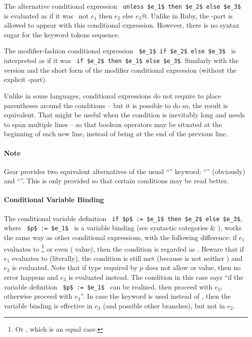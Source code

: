 The alternative conditional expression ~\lstinline!unless $e_1$ then $e_2$ else $e_3$!~ is evaluated as if it was ~\lstinline@if not $e_1$ then $e_2$ else $e_3$@. Unlike in Ruby, the -part is allowed to appear with this conditional expression. However, there is no syntax sugar for the  keyword tokens sequence. 

The modifier-fashion conditional expression ~\lstinline!$e_1$ if $e_2$ else $e_3$!~ is interpreted as if it was ~\lstinline!if $e_2$ then $e_1$ else $e_3$!. Similarly with the  version and the short form of the modifier conditional expression (without the explicit -part). 

Unlike in some languages, conditional expressions do not require to place parentheses around the conditions -- but it is possible to do so, the result is equivalent. That might be useful when the condition is inevitably long and needs to span multiple lines -- so that boolean operators may be situated at the beginning of each new line, instead of being at the end of the previous line. 

\paragraph{Note}
Gear provides two equivalent alternatives of the usual ``'' keyword: ``'' (obviously) and ``''. This is only provided so that certain conditions may be read better.

\paragraph{Conditional Variable Binding}
The conditional variable definition ~\lstinline!if $p$ := $e_1$ then $e_2$ else $e_3$!, where ~\lstinline!$p$ := $e_1$!~ is a variable binding (see syntactic categories  \& ), works the same way as other conditional expressions, with the following difference: if $e_1$ evaluates to \footnote{Or , which is an equal case.} or even \code{()} ( value), then the condition is regarded as . Beware that if $e_1$ evaluates to  (literally), the condition is still met (because  is not  neither \code{()}) and $e_2$ is evaluated. Note that if type required by $p$ does not allow  or \code{()} value, then no error happens and $e_3$ is evaluated instead. The condition in this case says ``if the variable definition ~\lstinline!$p$ := $e_1$!~ can be realized, then proceed with $e_2$, otherwise proceed with $e_3$''. In case the  keyword is used instead of , then the variable binding is effective in $e_3$ (and possible other  branches), but not in $e_2$.






